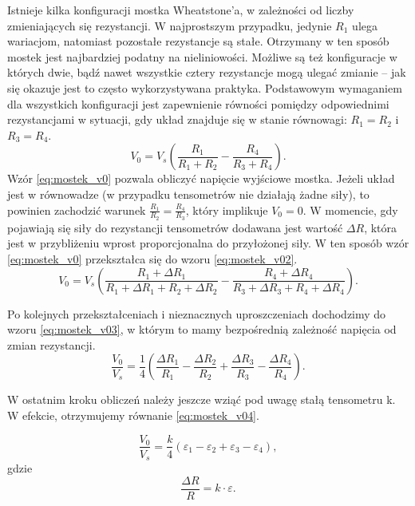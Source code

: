 \documentclass[printmode]{mgr}
\begin{document}
Istnieje kilka konfiguracji mostka Wheatstone'a, w zależności od liczby zmieniających się rezystancji.
W najprostszym przypadku, jedynie $R_1$ ulega wariacjom, natomiast pozostałe rezystancje są stałe. Otrzymany w ten sposób
mostek jest najbardziej podatny na nieliniowości. Możliwe są też konfiguracje w których dwie, bądź nawet wszystkie cztery rezystancje
mogą ulegać zmianie -- jak się okazuje jest to często wykorzystywana praktyka. Podstawowym wymaganiem dla wszystkich konfiguracji
jest zapewnienie równości pomiędzy odpowiednimi rezystancjami w sytuacji, gdy układ znajduje się w stanie równowagi: $R_1 = R_2$ i
$R_3 = R_4$.
\begin{equation}
V_0 = V_s (\frac{R_1}{R_1+R_2} - \frac{R_4}{R_3+R_4}).
\label{eq:mostek_v0}
\end{equation}
Wzór \ref{eq:mostek_v0} pozwala obliczyć napięcie wyjściowe mostka. Jeżeli układ jest w równowadze (w przypadku tensometrów nie działają
żadne siły), to powinien zachodzić warunek $\frac{R_1}{R_2} = \frac{R_4}{R_3}$, który implikuje $V_0 = 0$.
W momencie, gdy pojawiają się siły do rezystancji tensometrów dodawana jest wartość $\Delta R$, która jest w przybliżeniu
wprost proporcjonalna do przyłożonej siły. W ten sposób wzór \ref{eq:mostek_v0} przekształca się do wzoru \ref{eq:mostek_v02}.
\begin{equation}
V_0 = V_s (\frac{R_1 + \Delta R_1}{R_1 + \Delta R_1 +R_2  + \Delta R_2} - \frac{R_4 + \Delta R_4}{R_3 + \Delta R_3 + R_4 + \Delta R_4}).
\label{eq:mostek_v02}
\end{equation}

Po kolejnych przekształceniach i nieznacznych uproszczeniach dochodzimy do wzoru \ref{eq:mostek_v03}, w którym to
mamy bezpośrednią zależność napięcia od zmian rezystancji.
\begin{equation}
\frac{V_0}{V_s} = \frac{1}{4}(\frac{\Delta R_1}{R_1} - \frac{\Delta R_2}{R_2} + \frac{\Delta R_3}{R_3} - \frac{\Delta R_4}{R_4}).
\label{eq:mostek_v03}
\end{equation}

W ostatnim kroku obliczeń należy jeszcze wziąć pod uwagę stałą tensometru k. W efekcie, otrzymujemy równanie \ref{eq:mostek_v04}.

\begin{equation}
\frac{V_0}{V_s} = \frac{k}{4}(\varepsilon_1 - \varepsilon_2 + \varepsilon_3 - \varepsilon_4),
\label{eq:mostek_v04}
\end{equation}
gdzie
\begin{equation}
\frac{\Delta R}{R} = k \cdot \varepsilon.
\label{eq:mostek_v05}
\end{equation}
\end{document}
